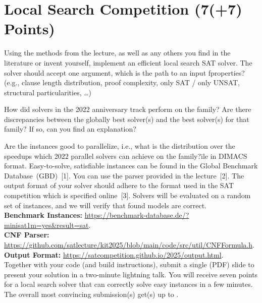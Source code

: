 \documentclass[a4paper]{article}
\begin{document}
\section{Local Search Competition (7(+7) Points)}

Using the methods from the lecture, as well as any others you find in the literature or invent yourself, implement an efficient local search SAT solver.
The solver should accept one argument, which is the path to an input fproperties? (e.g., clause length distribution, proof complexity, only SAT / only UNSAT, structural particularities, \ldots)
	\item How did solvers in the 2022 anniversary track perform on the family? Are there discrepancies between the globally best solver(s) and the best solver(s) for that family? If so, can you find an explanation?
	\item Are the instances good to parallelize, i.e., what is the distribution over the speedups which 2022 parallel solvers can achieve on the family?ile in DIMACS format.
Easy-to-solve, satisfiable instances can be found in the Global Benchmark Database~(GBD)~[1].
You can use the parser provided in the lecture~[2].
The output format of your solver should adhere to the format used in the SAT competition which is specified online~[3].
Solvers will be evaluated on a random set of instances, and we will verify that found models are correct.
~\\[1mm]

\noindent
[1] \textbf{Benchmark Instances:} \url{https://benchmark-database.de/?minisat1m=yes&result=sat}.\\[1ex]
\noindent
[2] \textbf{CNF Parser:} \url{https://github.com/satlecture/kit2025/blob/main/code/src/util/CNFFormula.h}.\\[1ex]
\noindent
[3] \textbf{Output Format:} \url{https://satcompetition.github.io/2025/output.html}.\\[1mm]

\noindent
Together with your code (and build instructions), submit a single (PDF) slide to present your solution in a two-minute lightning talk.
You will receive seven points for a local search solver that can correctly solve easy instances in a few minutes.
The overall most convincing submission(s) get(s) up to .
\end{document}
